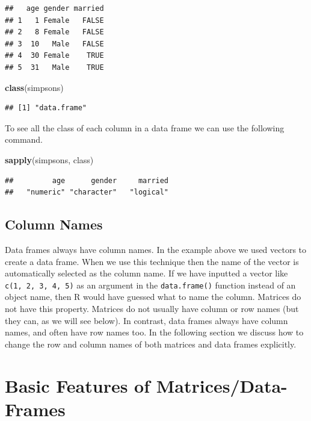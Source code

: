 \documentclass[
]{book}
\newenvironment{Shaded}{\begin{snugshade}}{\end{snugshade}}
\newcommand{\KeywordTok}[1]{\textcolor[rgb]{0.13,0.29,0.53}{\textbf{#1}}}
\newcommand{\NormalTok}[1]{#1}
\begin{document}
\begin{verbatim}
##   age gender married
## 1   1 Female   FALSE
## 2   8 Female   FALSE
## 3  10   Male   FALSE
## 4  30 Female    TRUE
## 5  31   Male    TRUE
\end{verbatim}

\begin{Shaded}
\begin{Highlighting}[]
\KeywordTok{class}\NormalTok{(simpsons)}
\end{Highlighting}
\end{Shaded}

\begin{verbatim}
## [1] "data.frame"
\end{verbatim}

To see all the class of each column in a data frame we can use the following command.

\begin{Shaded}
\begin{Highlighting}[]
\KeywordTok{sapply}\NormalTok{(simpsons, class)}
\end{Highlighting}
\end{Shaded}

\begin{verbatim}
##         age      gender     married 
##   "numeric" "character"   "logical"
\end{verbatim}

\hypertarget{column-names}{%
\subsection{Column Names}\label{column-names}}

Data frames always have column names. In the example above we used vectors to create a data frame. When we use this technique then the name of the vector is automatically selected as the column name. If we have inputted a vector like \texttt{c(1,\ 2,\ 3,\ 4,\ 5)} as an argument in the \texttt{data.frame()} function instead of an object name, then R would have guessed what to name the column. Matrices do not have this property. Matrices do not usually have column or row names (but they can, as we will see below). In contrast, data frames always have column names, and often have row names too. In the following section we discuss how to change the row and column names of both matrices and data frames explicitly.

\hypertarget{basic-features-of-matricesdata-frames}{%
\section{Basic Features of Matrices/Data-Frames}\label{basic-features-of-matricesdata-frames}}
\end{document}
